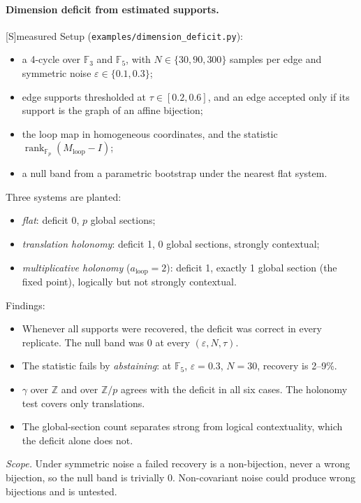 \documentclass[11pt]{article}
\theoremstyle{definition}
\theoremstyle{remark}
\newcommand{\Z}{\mathbb{Z}}
\newcommand{\F}{\mathbb{F}}
\newcommand{\src}[1]{\textsf{\small[#1]}}
\newcommand{\st}[1]{\textsf{\small\color{gray}#1}}
\begin{document}
\paragraph{Dimension deficit from estimated supports.}\src{S}\st{measured}
Setup (\texttt{examples/dimension\_deficit.py}):
\begin{itemize}
  \item a 4-cycle over $\F_3$ and $\F_5$, with $N\in\{30,90,300\}$ samples per edge and symmetric noise $\varepsilon\in\{0.1,0.3\}$;
  \item edge supports thresholded at $\tau\in[0.2,0.6]$, and an edge accepted only if its support is the graph of an affine bijection;
  \item the loop map in homogeneous coordinates, and the statistic $\operatorname{rank}_{\F_p}(M_{\text{loop}}-I)$;
  \item a null band from a parametric bootstrap under the nearest flat system.
\end{itemize}
Three systems are planted:
\begin{itemize}
  \item \emph{flat}: deficit 0, $p$ global sections;
  \item \emph{translation holonomy}: deficit 1, 0 global sections, strongly contextual;
  \item \emph{multiplicative holonomy} ($a_{\text{loop}}=2$): deficit 1, exactly 1 global section (the fixed point), logically but not strongly contextual.
\end{itemize}
Findings:
\begin{itemize}
  \item Whenever all supports were recovered, the deficit was correct in every replicate. The null band was 0 at every $(\varepsilon,N,\tau)$.
  \item The statistic fails by \emph{abstaining}: at $\F_5$, $\varepsilon=0.3$, $N=30$, recovery is 2--9\%.
  \item $\gamma$ over $\Z$ and over $\Z/p$ agrees with the deficit in all six cases. The holonomy test covers only translations.
  \item The global-section count separates strong from logical contextuality, which the deficit alone does not.
\end{itemize}
\emph{Scope.} Under symmetric noise a failed recovery is a non-bijection, never a wrong bijection, so the null band is trivially 0. Non-covariant noise could produce wrong bijections and is untested.
\end{document}
